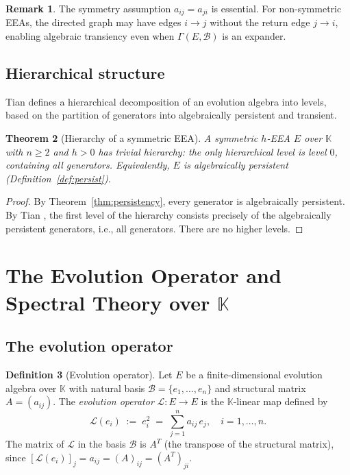 \documentclass[12pt,a4paper]{amsart}
\newtheorem{theorem}{Theorem}[section]
\theoremstyle{definition}
\newtheorem{definition}[theorem]{Definition}
\newtheorem{remark}[theorem]{Remark}
\newcommand{\K}{\mathbb{K}}
\newcommand{\EA}{E}          %
\newcommand{\natbasis}{\mathcal{B}}  %
\newcommand{\strmat}{A}      %
\newcommand{\evop}{\mathcal{L}} %
\begin{document}
\begin{remark}
The symmetry assumption $a_{ij}=a_{ji}$ is essential.  For non-symmetric
EEAs, the directed graph may have edges $i\to j$ without the return edge
$j\to i$, enabling algebraic transiency even when $\varGamma(\EA,\natbasis)$
is an expander.
\end{remark}

\subsection{Hierarchical structure}

Tian \cite{Tian2008} defines a hierarchical decomposition of an
evolution algebra into levels, based on the partition of generators into
algebraically persistent and transient.

\begin{theorem}[Hierarchy of a symmetric EEA]\label{thm:hierarchy}
A symmetric $h$-EEA $\EA$ over $\K$ with $n\ge 2$ and $h>0$ has
\emph{trivial hierarchy}: the only hierarchical level is level $0$,
containing all generators.  Equivalently, $\EA$ is \emph{algebraically
persistent} (Definition~\ref{def:persist}).
\end{theorem}

\begin{proof}
By Theorem~\ref{thm:persistency}, every generator is algebraically
persistent.  By Tian \cite[Chapter~3, \S3.5]{Tian2008}, the first level
of the hierarchy consists precisely of the algebraically persistent
generators, i.e., all generators.  There are no higher levels.
\end{proof}

\section{The Evolution Operator and Spectral Theory over $\K$}
\label{sec:evop}

\subsection{The evolution operator}

\begin{definition}[Evolution operator]\label{def:evop}
Let $\EA$ be a finite-dimensional evolution algebra over $\K$ with
natural basis $\natbasis=\{e_1,\ldots,e_n\}$ and structural matrix
$\strmat=(a_{ij})$.  The \emph{evolution operator}
$\evop:\EA\to\EA$ is the $\K$-linear map defined by
\[
  \evop(e_i) \;:=\; e_i^2 \;=\; \sum_{j=1}^n a_{ij}\,e_j,
  \quad i=1,\ldots,n.
\]
The matrix of $\evop$ in the basis $\natbasis$ is $\strmat^T$ (the
transpose of the structural matrix), since $[\evop(e_i)]_j = a_{ij} =
(\strmat)_{ij}=(\strmat^T)_{ji}$.
\end{definition}
\end{document}

